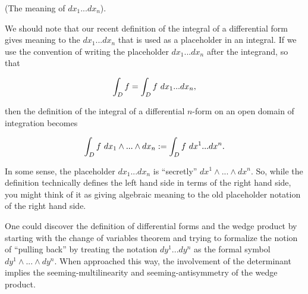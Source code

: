 \begin{remark}
    (The meaning of $dx_1 ... dx_n$).
    
    We should note that our recent definition of the integral of a differential form gives meaning to the $dx_1 ... dx_n$ that is used as a placeholder in an integral. If we use the convention of writing the placeholder $dx_1 ... dx_n$ after the integrand, so that
    
    \begin{align*}
        \int_D f = \int_D f \text{ } dx_1 ... dx_n,
    \end{align*}
    
    then the definition of the integral of a differential $n$-form on an open domain of integration becomes
    
    \begin{align*}
        \int_D f \text{ } dx_1 \wedge ... \wedge dx_n := \int_D f \text{ } dx^1 ... dx^n.
    \end{align*}

    In some sense, the placeholder $dx_1 ... dx_n$ is ``secretly'' $dx^1 \wedge ... \wedge dx^n$. So, while the definition technically defines the left hand side in terms of the right hand side, you might think of it as giving algebraic meaning to the old placeholder notation of the right hand side.
\end{remark}

\begin{remark}
    One could discover the definition of differential forms and the wedge product by starting with the change of variables theorem and trying to formalize the notion of ``pulling back'' by treating the notation $dy^1 ... dy^n$ as the formal symbol $dy^1 \wedge ... \wedge dy^n$. When approached this way, the involvement of the determinant implies the seeming-multilinearity and seeming-antisymmetry of the wedge product.
\end{remark}

